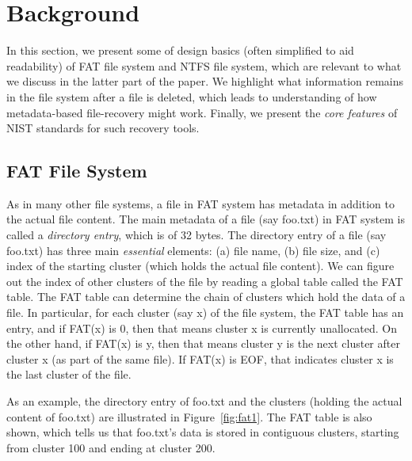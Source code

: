 \section{Background}

In this section, we present some of design basics (often simplified to aid readability) of FAT file system and NTFS file system, 
which are relevant to what we discuss in the latter part of the paper. 
We highlight what information remains in the file system after a file is deleted, 
which leads to understanding of how metadata-based file-recovery might work. 
Finally, we present the \emph{core features} of NIST standards for such recovery tools.  

\subsection{FAT File System}
As in many other file systems, a file in FAT system has metadata in addition to the actual file content. 
The main metadata of a file (say foo.txt) in FAT system is called a \emph{directory entry}, which is of 32 bytes.
The directory entry of a file (say foo.txt) has three main \emph{essential} elements: (a) file name, (b) file size, and 
(c) index of the starting cluster (which holds the actual file content). We can figure 
out the index of other clusters of the file by reading a global table called the FAT table. The FAT table
can determine the chain of clusters which hold the data of a file. In particular, 
for each cluster (say x) of the file system, the FAT table has an entry, and 
if FAT(x) is 0, then that means cluster x is currently unallocated. 
On the other hand, if FAT(x) is y, then that means cluster y is the next cluster after cluster x (as part of the same file).
If FAT(x) is EOF, that indicates cluster x is the last cluster of the file.
   
As an example, the directory entry of foo.txt and the clusters (holding the actual content of foo.txt) 
are illustrated in Figure~\ref{fig:fat1}. The FAT table is also shown, which tells us that foo.txt's data is stored 
in contiguous clusters, starting from cluster 100 and ending at cluster 200.

